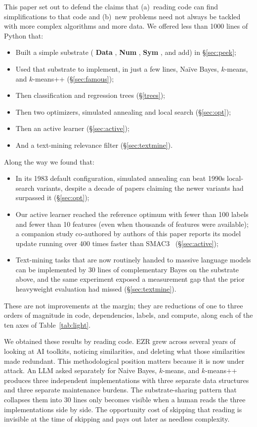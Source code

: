 \documentclass[AMA,STIX2COL]{WileyNJDv5}
\newcommand{\NEW}[1]{\textcolor{newblue}{#1}}
\newcommand{\IT}{{\sffamily EZR}}
\newcommand{\cls}[1]{%
  \setlength{\fboxsep}{1.5pt}%
  \colorbox{clsbg}{\sffamily\bfseries{#1}}%
}
\begin{document}
This paper set out to defend the claims
that (a)~reading code can find simplifications
to that code and (b)~new problems need not always be
tackled with more complex algorithms and more data. We offered
\NEW{less than 1000 lines} of Python that:
\begin{itemize}
\item Built a simple substrate (\cls{Data}, \cls{Num},
\cls{Sym}, and \textsf{add}) in \S\ref{sec:peek};
\item Used that substrate to implement, in just a few lines,
Naïve Bayes, $k$-means, and $k$-means++ (\S\ref{sec:famous});
\item Then classification and regression trees
(\S\ref{trees});
\item Then two optimizers, simulated annealing and local
search (\S\ref{sec:opt});
\item Then an active learner (\S\ref{sec:active});
\item And a text-mining relevance filter
(\S\ref{sec:textmine}).
\end{itemize}

Along the way we found that:
\begin{itemize}
\item In its 1983 default configuration, simulated annealing
can beat 1990s local-search variants, despite a decade of
papers claiming the newer variants had surpassed it
(\S\ref{sec:opt});
\item Our active learner reached the reference optimum with
fewer than 100 labels and fewer than 10 features (even when
thousands of features were available); a companion study
co-authored by \NEW{authors of this paper} reports its model update running
\NEW{over 400 times} faster than SMAC3~\cite{ganguly2026lowgodatalightse}
(\S\ref{sec:active});
\item Text-mining tasks that are now routinely handed to
massive language models can be implemented by 30 lines of
complementary Bayes on the substrate above, and the same
experiment exposed a measurement gap that the prior
heavyweight evaluation had missed (\S\ref{sec:textmine}).
\end{itemize}
These are not improvements at the margin; they are reductions
of one to three orders of magnitude in code, dependencies,
labels, and compute, along each of the ten axes of
Table~\ref{tab:light}.

We obtained these results by reading code. \IT{} grew across
several years of looking at AI toolkits, noticing similarities,
and deleting what those similarities made redundant. This
methodological position matters because it is now under attack.
An LLM asked separately for Naive Bayes, $k$-means, and
$k$-means++ produces three independent implementations with
three separate data structures and three separate maintenance
burdens. The substrate-sharing pattern that collapses them into
30 lines only becomes visible when a human reads the three
implementations side by side. The opportunity cost of skipping
that reading is invisible at the time of skipping and pays out
later as needless complexity.
\end{document}
